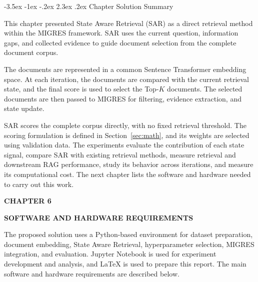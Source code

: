 \documentclass[12pt,a4paper]{report}
\makeatletter
\renewcommand\section{\@startsection{section}{1}{\z@}%
    {-3.5ex \@plus -1ex \@minus -.2ex}%
    {2.3ex \@plus.2ex}%
    {\normalfont\fontsize{16}{19}\selectfont\bfseries}}
\newcommand{\chaptertitle}[2]{
    \begin{flushright}
        {\fontsize{22}{26}\selectfont\bfseries CHAPTER #1\par}
        \vspace{0.10in}
        {\fontsize{22}{26}\selectfont\bfseries #2\par}
    \end{flushright}
    \vspace{0.12in}
}
\makeatother
\begin{document}
\section{Chapter Solution Summary}

This chapter presented State Aware Retrieval (SAR) as a direct retrieval
method within the MIGRES framework. SAR uses the current question,
information gaps, and collected evidence to guide document selection
from the complete document corpus.

The documents are represented in a common Sentence Transformer
embedding space. At each iteration, the documents are compared with the
current retrieval state, and the final score is used to select the
Top-$K$ documents. The selected documents are then passed to MIGRES for
filtering, evidence extraction, and state update.

SAR scores the complete corpus directly, with no fixed retrieval threshold. The scoring formulation is defined in Section~\ref{sec:math}, and its weights are selected using validation data. The experiments evaluate the contribution of each state signal, compare SAR with existing retrieval methods, measure retrieval and downstream RAG performance, study its behavior across iterations, and measure its computational cost. The next chapter lists the software and hardware needed to carry out this work.
\label{ch:5:end}

\clearpage


\setcounter{table}{0}
\renewcommand{\thetable}{6.\arabic{table}}
\renewcommand{\theHtable}{chapter6.\arabic{table}}


\chaptertitle{6}{SOFTWARE AND HARDWARE REQUIREMENTS}
\label{ch:6}

\justifying

The proposed solution uses a Python-based environment for dataset
preparation, document embedding, State Aware Retrieval, hyperparameter
selection, MIGRES integration, and evaluation. Jupyter Notebook \cite{kluyver2016jupyter} is used
for experiment development and analysis, and LaTeX is used to prepare
this report. The main software and hardware requirements are described
below.
\end{document}
